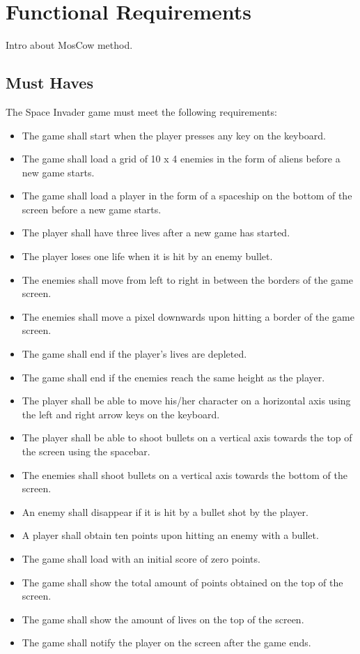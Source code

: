 \section{Functional Requirements}

Intro about MosCow method.

\subsection{Must Haves}
The Space Invader game must meet the following requirements:
\begin{itemize}
	\item The game shall start when the player presses any key on the keyboard.
	\item The game shall load a grid of 10 x 4 enemies in the form of aliens before a new game starts.
	\item The game shall load a player in the form of a spaceship on the bottom of the screen before a new game starts.
	\item The player shall have three lives after a new game has started.
	\item The player loses one life when it is hit by an enemy bullet.
	\item The enemies shall move from left to right in between the borders of the game screen.
	\item The enemies shall move a pixel downwards upon hitting a border of the game screen.
	\item The game shall end if the player's lives are depleted.
	\item The game shall end if the enemies reach the same height as the player.
	\item The player shall be able to move his/her character on a horizontal axis using the left and right arrow keys on the keyboard.
	\item The player shall be able to shoot bullets on a vertical axis towards the top of the screen using the spacebar.
	\item The enemies shall shoot bullets on a vertical axis towards the bottom of the screen.
	\item An enemy shall disappear if it is hit by a bullet shot by the player.
	\item A player shall obtain ten points upon hitting an enemy with a bullet.
	\item The game shall load with an initial score of zero points.
	\item The game shall show the total amount of points obtained on the top of the screen.
	\item The game shall show the amount of lives on the top of the screen.
	\item The game shall notify the player on the screen after the game ends.
\end{itemize}

